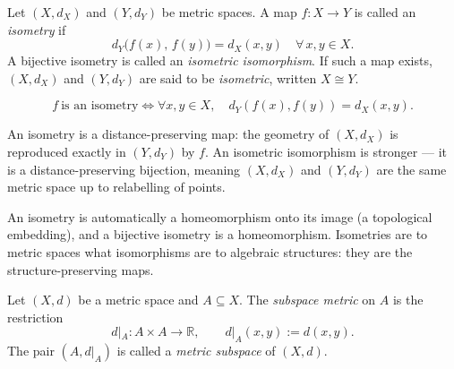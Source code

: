 \begin{tcolorbox}[colback=propbox, colframe=propborder, arc=2pt,
  left=6pt, right=6pt, top=4pt, bottom=4pt,
  title={\small\textbf{Definition (Isometry; Isometric Isomorphism)}},
  fonttitle=\small\bfseries]
\begin{definition}
\label{def:isometry}
Let $(X,d_X)$ and $(Y,d_Y)$ be metric spaces.
A map $f : X \to Y$ is called an \emph{isometry} if
\[
d_Y\bigl(f(x),\, f(y)\bigr) = d_X(x,y)
\quad \forall\, x,y \in X.
\]
A bijective isometry is called an \emph{isometric isomorphism}.
If such a map exists, $(X,d_X)$ and $(Y,d_Y)$ are said to be
\emph{isometric}, written $X \cong Y$.
\end{definition}
\end{tcolorbox}

\begin{remark*}
\[
f\ \text{is an isometry}
\iff
\forall x, y \in X,\quad
d_Y(f(x), f(y)) = d_X(x,y).
\]
\end{remark*}



\begin{remark*}[Intuition]
An isometry is a distance-preserving map: the geometry of $(X,d_X)$
is reproduced exactly in $(Y,d_Y)$ by $f$.
An isometric isomorphism is stronger --- it is a distance-preserving
bijection, meaning $(X,d_X)$ and $(Y,d_Y)$ are the same metric space
up to relabelling of points.
\end{remark*}

\begin{remark*}
An isometry is automatically a homeomorphism onto its image (a topological
embedding), and a bijective isometry is a homeomorphism.
Isometries are to metric spaces what isomorphisms are to algebraic structures:
they are the structure-preserving maps.
\end{remark*}

\begin{tcolorbox}[colback=propbox, colframe=propborder, arc=2pt,
  left=6pt, right=6pt, top=4pt, bottom=4pt,
  title={\small\textbf{Definition (Subspace Metric)}},
  fonttitle=\small\bfseries]
\begin{definition}
\label{def:subspace-metric}
Let $(X,d)$ be a metric space and $A \subseteq X$.
The \emph{subspace metric} on $A$ is the restriction
\[
d|_A : A \times A \to \mathbb{R},
\qquad
d|_A(x,y) := d(x,y).
\]
The pair $(A, d|_A)$ is called a \emph{metric subspace} of $(X,d)$.
\end{definition}
\end{tcolorbox}

